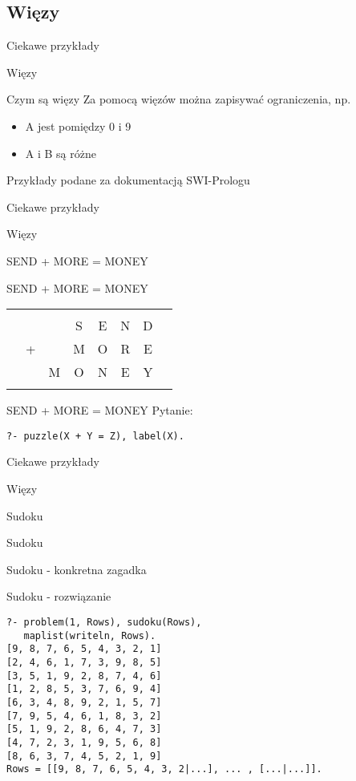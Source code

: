 \documentclass[blue]{beamer}
\newcommand{\tytulprz}[2]{\begin{frame}\begin{center}\begin{Huge}Ciekawe przykłady\end{Huge}

\hspace{20pt}

\begin{huge}#1\end{huge}

\hspace{10pt}

\begin{large}#2\end{large}\end{center}\end{frame}}
\begin{document}
\subsection{Więzy}
\tytulprz{Więzy}{}
\begin{frame}{Czym są więzy}
Za pomocą więzów można zapisywać ograniczenia, np.
\begin{itemize}
\item A jest pomiędzy 0 i 9
\item A i B są różne
\end{itemize}

Przykłady podane za dokumentacją SWI-Prologu
\end{frame}
\tytulprz{Więzy}{SEND + MORE = MONEY}
\begin{frame}{SEND + MORE = MONEY}
\begin{center}
\begin{Huge}
\begin{tabular}{|p{20pt}ccccccp{20pt}|}
\hline
 & & & & & & & \\ 
 & & & S & E & N & D & \\ 
 & + &  & M & O & R & E & \\ 
\cline{2-7} 
 & & M & O & N & E & Y & \\ 
 & & & & & & & \\
\hline
\end{tabular}
\end{Huge} 
\end{center}
\end{frame}
\begin{frame}[fragile]{SEND + MORE = MONEY}
Pytanie:
\begin{lstlisting}
?- puzzle(X + Y = Z), label(X).
\end{lstlisting}

\end{frame}
\tytulprz{Więzy}{Sudoku}
\begin{frame}{Sudoku}

\end{frame}
\begin{frame}{Sudoku - konkretna zagadka}

\end{frame}
\begin{frame}[fragile]{Sudoku - rozwiązanie}
\begin{lstlisting}
?- problem(1, Rows), sudoku(Rows),
   maplist(writeln, Rows).
[9, 8, 7, 6, 5, 4, 3, 2, 1]
[2, 4, 6, 1, 7, 3, 9, 8, 5]
[3, 5, 1, 9, 2, 8, 7, 4, 6]
[1, 2, 8, 5, 3, 7, 6, 9, 4]
[6, 3, 4, 8, 9, 2, 1, 5, 7]
[7, 9, 5, 4, 6, 1, 8, 3, 2]
[5, 1, 9, 2, 8, 6, 4, 7, 3]
[4, 7, 2, 3, 1, 9, 5, 6, 8]
[8, 6, 3, 7, 4, 5, 2, 1, 9]
Rows = [[9, 8, 7, 6, 5, 4, 3, 2|...], ... , [...|...]].
\end{lstlisting}
\end{frame}
\end{document}
